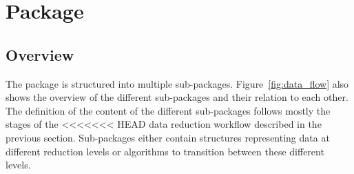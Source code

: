 \documentclass[longauth]{aa}
\begin{document}
 
 
 
 





\section{\gammapy Package}
\label{sec:gammapy-package}
\subsection{Overview}
\label{ssec:overview}
%
The \gammapy package is structured into multiple sub-packages. 
Figure~\ref{fig:data_flow} also shows the overview of the different sub-packages and
their relation to each other. The definition
of the content of the different sub-packages follows mostly the stages of the
<<<<<<< HEAD
data reduction workflow described in the previous section. Sub-packages
either contain structures representing data at different reduction
levels or algorithms to transition between these different levels.
\end{document}
